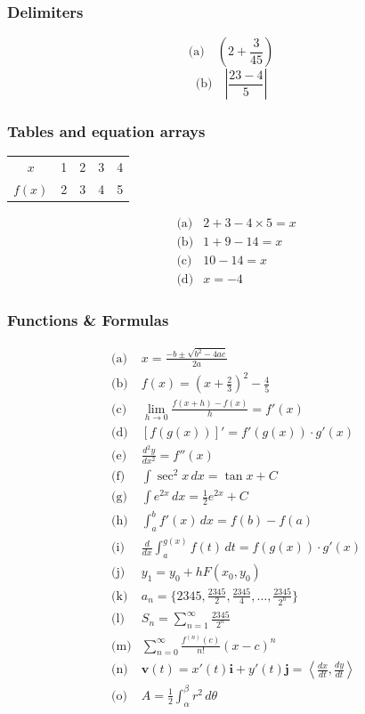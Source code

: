 \documentclass{article}
\begin{document}
\subsubsection{Delimiters}
\[
    \text{(a)} \quad \left( 2 + \frac{3}{45} \right)
\]
\[
    \text{(b)} \quad \left| \frac{23 - 4}{5} \right|
\]

\subsubsection{Tables and equation arrays}
\begin{center}
    \begin{tabular}{c c c c c}
        $x$ & 1 & 2 & 3 & 4 \\
        $f(x)$ & 2 & 3 & 4 & 5 \\
    \end{tabular}
\end{center}

\begin{align}
    &\text{(a)} & 2 + 3 - 4 \times 5 = x \\
    &\text{(b)} & 1 + 9 - 14 = x \\
    &\text{(c)} & 10 - 14 = x \\
    &\text{(d)} & x = -4
\end{align}

\subsubsection{Functions \& Formulas}
\begin{align*}
    &\text{(a)} & x = \frac{-b \pm \sqrt{b^2 - 4ac}}{2a} \\
    &\text{(b)} & f(x) = \left( x + \frac{2}{3} \right)^2 - \frac{4}{5} \\
    &\text{(c)} & \lim_{h \to 0} \frac{f(x+h) - f(x)}{h} = f'(x) \\
    &\text{(d)} & [f(g(x))]' = f'(g(x)) \cdot g'(x) \\
    &\text{(e)} & \frac{d^2 y}{dx^2} = f''(x) \\
    &\text{(f)} & \int \sec^2 x \, dx = \tan x + C \\
    &\text{(g)} & \int e^{2x} \, dx = \frac{1}{2} e^{2x} + C \\
    &\text{(h)} & \int_{a}^{b} f'(x) \, dx = f(b) - f(a) \\
    &\text{(i)} & \frac{d}{dx} \int_{a}^{g(x)} f(t) \, dt = f(g(x)) \cdot g'(x) \\
    &\text{(j)} & y_1 = y_0 + hF(x_0, y_0) \\
    &\text{(k)} & a_n = \{2345, \frac{2345}{2}, \frac{2345}{4}, \ldots, \frac{2345}{2^n}\} \\
    &\text{(l)} & S_n = \sum_{n=1}^{\infty} \frac{2345}{2^n} \\
    &\text{(m)} & \sum_{n=0}^{\infty} \frac{f^{(n)}(c)}{n!} (x-c)^n \\
    &\text{(n)} & \mathbf{v}(t) = x'(t) \mathbf{i} + y'(t) \mathbf{j} = \left\langle \frac{dx}{dt}, \frac{dy}{dt} \right\rangle \\
    &\text{(o)} & A = \frac{1}{2} \int_{\alpha}^{\beta} r^2 \, d\theta \\
\end{align*}
\end{document}
